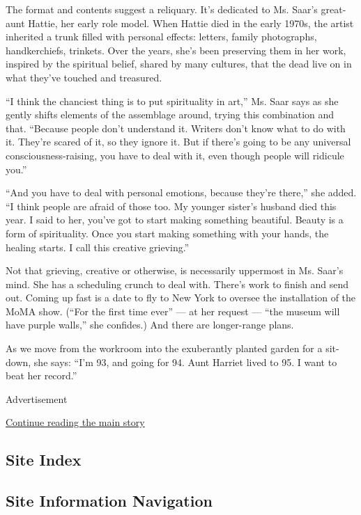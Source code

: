 The format and contents suggest a reliquary. It's dedicated to Ms.
Saar's great-aunt Hattie, her early role model. When Hattie died in the
early 1970s, the artist inherited a trunk filled with personal effects:
letters, family photographs, handkerchiefs, trinkets. Over the years,
she's been preserving them in her work, inspired by the spiritual
belief, shared by many cultures, that the dead live on in what they've
touched and treasured.

``I think the chanciest thing is to put spirituality in art,'' Ms. Saar
says as she gently shifts elements of the assemblage around, trying this
combination and that. ``Because people don't understand it. Writers
don't know what to do with it. They're scared of it, so they ignore it.
But if there's going to be any universal consciousness-raising, you have
to deal with it, even though people will ridicule you.''

``And you have to deal with personal emotions, because they're there,''
she added. ``I think people are afraid of those too. My younger sister's
husband died this year. I said to her, you've got to start making
something beautiful. Beauty is a form of spirituality. Once you start
making something with your hands, the healing starts. I call this
creative grieving.''

Not that grieving, creative or otherwise, is necessarily uppermost in
Ms. Saar's mind. She has a scheduling crunch to deal with. There's work
to finish and send out. Coming up fast is a date to fly to New York to
oversee the installation of the MoMA show. (``For the first time ever''
--- at her request --- ``the museum will have purple walls,'' she
confides.) And there are longer-range plans.

As we move from the workroom into the exuberantly planted garden for a
sit-down, she says: ``I'm 93, and going for 94. Aunt Harriet lived to
95. I want to beat her record.''

Advertisement

\protect\hyperlink{after-bottom}{Continue reading the main story}

\hypertarget{site-index}{%
\subsection{Site Index}\label{site-index}}

\hypertarget{site-information-navigation}{%
\subsection{Site Information
Navigation}\label{site-information-navigation}}

